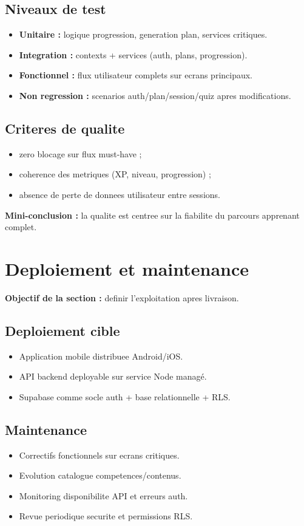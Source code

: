\documentclass[12pt,a4paper]{article}
\begin{document}
\subsection{Niveaux de test}
\begin{itemize}
  \item \textbf{Unitaire :} logique progression, generation plan, services critiques.
  \item \textbf{Integration :} contexts + services (auth, plans, progression).
  \item \textbf{Fonctionnel :} flux utilisateur complets sur ecrans principaux.
  \item \textbf{Non regression :} scenarios auth/plan/session/quiz apres modifications.
\end{itemize}

\subsection{Criteres de qualite}
\begin{itemize}
  \item zero blocage sur flux must-have ;
  \item coherence des metriques (XP, niveau, progression) ;
  \item absence de perte de donnees utilisateur entre sessions.
\end{itemize}

\textbf{Mini-conclusion :} la qualite est centree sur la fiabilite du parcours apprenant complet.

\section{Deploiement et maintenance}
\textbf{Objectif de la section :} definir l'exploitation apres livraison.

\subsection{Deploiement cible}
\begin{itemize}
  \item Application mobile distribuee Android/iOS.
  \item API backend deployable sur service Node managé.
  \item Supabase comme socle auth + base relationnelle + RLS.
\end{itemize}

\subsection{Maintenance}
\begin{itemize}
  \item Correctifs fonctionnels sur ecrans critiques.
  \item Evolution catalogue competences/contenus.
  \item Monitoring disponibilite API et erreurs auth.
  \item Revue periodique securite et permissions RLS.
\end{itemize}
\end{document}
